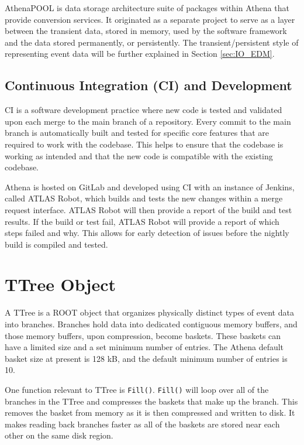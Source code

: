 AthenaPOOL is data storage architecture suite of packages within Athena that provide conversion services. 
It originated as a separate project to serve as a layer between the transient data, stored in memory, used by the software framework and the data stored permanently, or persistently.
The transient/persistent style of representing event data will be further explained in Section \ref{sec:IO_EDM}.



\subsection{Continuous Integration (CI) and Development}
CI is a software development practice where new code is tested and validated upon each merge to the main branch of a repository. 
Every commit to the main branch is automatically built and tested for specific core features that are required to work with the codebase. 
This helps to ensure that the codebase is working as intended and that the new code is compatible with the existing codebase.

Athena is hosted on GitLab and developed using CI with an instance of Jenkins, called ATLAS Robot, which builds and tests the new changes within a merge request interface. 
ATLAS Robot will then provide a report of the build and test results.
If the build or test fail, ATLAS Robot will provide a report of which steps failed and why.
This allows for early detection of issues before the nightly build is compiled and tested.



\section{TTree Object} \label{section: ATLASIO_TTreeObject}
A TTree is a ROOT object that organizes physically distinct types of event data into branches.
Branches hold data into dedicated contiguous memory buffers, and those memory buffers, upon compression, become baskets.
These baskets can have a limited size and a set minimum number of entries. 
The Athena default basket size at present is 128 kB, and the default minimum number of entries is 10. 

One function relevant to TTree is \verb|Fill()|. 
\verb|Fill()| will loop over all of the branches in the TTree and compresses the baskets that make up the branch.
This removes the basket from memory as it is then compressed and written to disk.
It makes reading back branches faster as all of the baskets are stored near each other on the same disk region. \cite{ROOT_TTree}


